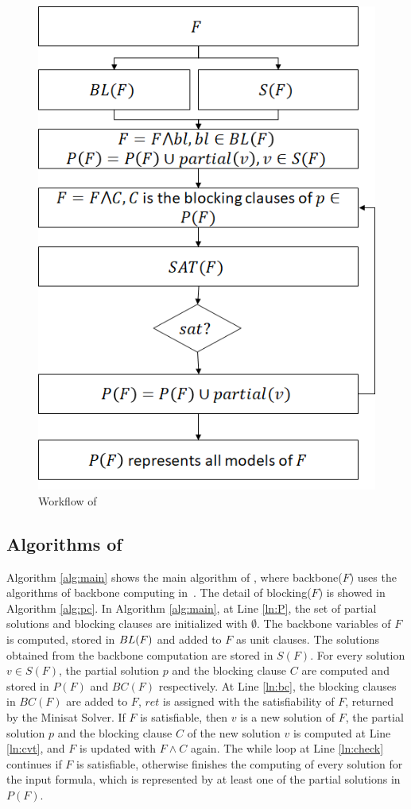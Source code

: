 \begin{figure}
    \centering
    \includegraphics[scale=0.4]{workflow.png}
    \caption{Workflow of \tool}
    \label{fig:overflow}
\end{figure}

\subsection{Algorithms of \tool}
Algorithm \ref{alg:main} shows the main algorithm of \tool, where backbone($F$) uses the algorithms of backbone computing in~\cite{bb}.
The detail of blocking($F$) is showed in Algorithm \ref{alg:pc}.
In Algorithm \ref{alg:main}, at Line \ref{ln:P}, the set of partial solutions and blocking clauses are initialized with $\emptyset$. The backbone variables of $F$ is computed, stored in ${\sc BL}(F)$ and added to $F$ as unit clauses. The solutions obtained from the backbone computation are stored in $S(F)$.
For every solution $v\in S(F)$, the partial solution $p$ and the blocking clause $C$ are computed and stored in $P(F)$ and $BC(F)$ respectively. 
At Line \ref{ln:bc}, the blocking clauses in $BC(F)$ are added to $F$, $ret$ is assigned with the satisfiability of $F$, returned by the Minisat Solver. If $F$ is satisfiable, then $v$ is a new solution of $F$, the partial solution $p$ and the blocking clause $C$ of the new solution $v$ is computed at Line \ref{ln:cvt}, and $F$ is updated with $F\wedge C$ again. The while loop at Line \ref{ln:check} continues if $F$ is satisfiable, otherwise \tool finishes the computing of every solution for the input formula, which is represented by at least one of the partial solutions in $P(F)$.

